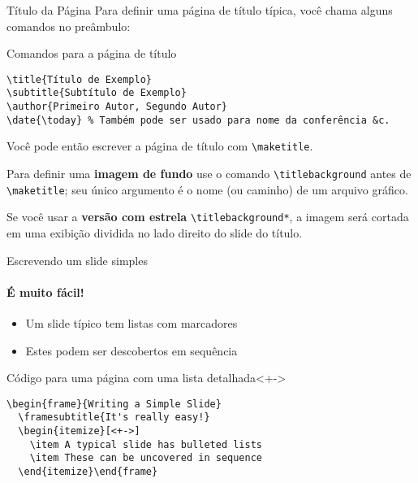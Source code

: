 \begin{frame}[fragile]{Título da Página}
Para definir uma página de título típica, você chama alguns comandos no preâmbulo:
\begin{block}{Comandos para a página de título}
\begin{verbatim}
\title{Título de Exemplo}
\subtitle{Subtítulo de Exemplo}
\author{Primeiro Autor, Segundo Autor}
\date{\today} % Também pode ser usado para nome da conferência &c.
\end{verbatim}
\end{block}
Você pode então escrever a página de título com \verb|\maketitle|.

Para definir uma \textbf{imagem de fundo} use o comando \verb|\titlebackground| antes de \verb|\maketitle|; seu único argumento é o nome (ou caminho) de um arquivo gráfico.

Se você usar a \textbf{versão com estrela} \verb|\titlebackground*|,  a imagem será cortada em uma exibição dividida no lado direito do slide do título.
\end{frame}

\begin{frame}[fragile]{Escrevendo um slide simples}
\framesubtitle{ É muito fácil!}
\begin{itemize}[<+->]
\item Um slide típico tem listas com marcadores
\item Estes podem ser descobertos em sequência
\end{itemize}
\begin{block}{Código para uma página com uma lista detalhada}<+->
\begin{verbatim}
\begin{frame}{Writing a Simple Slide}
  \framesubtitle{It's really easy!}
  \begin{itemize}[<+->]
    \item A typical slide has bulleted lists
    \item These can be uncovered in sequence
  \end{itemize}\end{frame}
\end{verbatim}
\end{block}
\end{frame}
